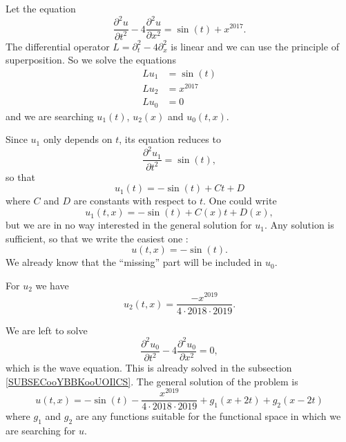 \begin{example}
    Let the equation
    \begin{equation}
        \frac{ \partial^2u }{ \partial t^2 }-4\frac{ \partial^2u }{ \partial x^2 }=\sin(t)+x^{2017}.
    \end{equation}
    The differential operator \( L=\partial_t^2-4\partial_x^2\) is linear and we can use the principle of superposition. So we solve the equations
    \begin{subequations}
        \begin{align}
            Lu_1&=\sin(t)\\
            Lu_2&=x^{2017}\\
            Lu_0&=0
        \end{align}
    \end{subequations}
    and we are searching \( u_1(t)\), \( u_2(x)\) and \( u_0(t,x)\).

    Since \( u_1\) only depends on \( t\), its equation reduces to
    \begin{equation}
        \frac{ \partial^2u_1 }{ \partial t^2 }=\sin(t),   
    \end{equation}
    so that 
    \begin{equation}
        u_1(t)=-\sin(t)+Ct+D
    \end{equation}
    where \( C\) and \( D\) are constants with respect to \( t\). One could write
    \begin{equation}
        u_1(t,x)=-\sin(t)+C(x)t+D(x),
    \end{equation}
    but we are in no way interested in the general solution for \( u_1\). Any solution is sufficient, so that we write the easiest one :
    \begin{equation}
        u(t,x)=-\sin(t).
    \end{equation}
    We already know that the ``missing'' part will be included in \( u_0\).   

    For \( u_2\) we have
    \begin{equation}
        u_2(t,x)=\frac{ -x^{2019} }{ 4\cdot 2018\cdot 2019 }.
    \end{equation}
    
    We are left to solve
    \begin{equation}
        \frac{ \partial^2u_0 }{ \partial t^2 }-4\frac{ \partial^2u_0 }{ \partial x^2 }=0,
    \end{equation}
    which is the wave equation. This is already solved in the subsection \ref{SUBSECooYBBKooUOIlCS}. The general solution of the problem is
    \begin{equation}
        u(t,x)=-\sin(t)-\frac{ x^{2019} }{ 4\cdot 2018\cdot 2019 }+g_1(x+2t)+g_2(x-2t)
    \end{equation}
    where \( g_1\) and \( g_2\) are any functions suitable for the functional space in which we are searching for \( u\).
\end{example}

